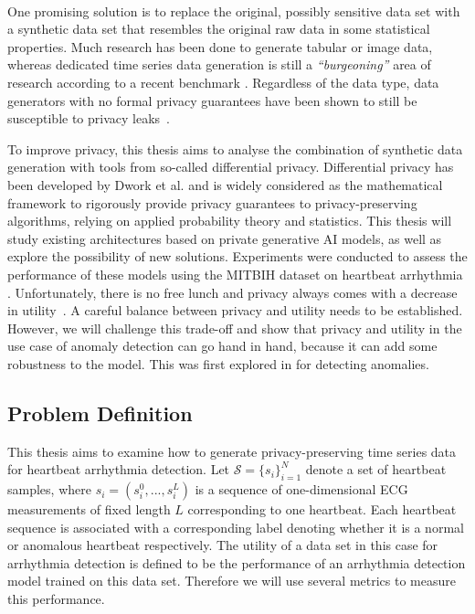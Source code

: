 \paragraph{}
One promising solution \parencite[see][]{jordon2022synthetic} is to replace the original, possibly sensitive data set with a synthetic data set that resembles the original raw data in some statistical properties. Much research has been done to generate tabular or image data, whereas dedicated time series data generation is still a \textit{``burgeoning''} area of research according to a recent benchmark \parencite[][]{ang2023tsgbench}. Regardless of the data type, data generators with no formal privacy guarantees have been shown to still be susceptible to privacy leaks~\cite{stadler2022synthetic}. 

To improve privacy, this thesis aims to analyse the combination of synthetic data generation with tools from so-called differential privacy. Differential privacy has been developed by Dwork et al. \parencite{dwork2006differential} and is widely considered as the mathematical framework to rigorously provide privacy guarantees to privacy-preserving algorithms, relying on applied probability theory and statistics. This thesis will study existing architectures based on private generative AI models, as well as explore the possibility of new solutions. Experiments were conducted to assess the performance of these models using the MITBIH dataset on heartbeat arrhythmia \parencite[][]{moody2001impact}. Unfortunately, there is no free lunch and privacy always comes with a decrease in utility~\cite{stadler2022synthetic}. A careful balance between privacy and utility needs to be established. However, we will challenge this trade-off and show that privacy and utility in the use case of anomaly detection can go hand in hand, because it can add some robustness to the model. This was first explored in \Parencite{du2019robust} for detecting anomalies.


\subsection{Problem Definition}

This thesis aims to examine how to generate privacy-preserving time series data for heartbeat arrhythmia detection. Let $\mathcal{S}={\{s_i\}}_{i=1}^N$ denote a set of heartbeat samples, where $s_i=(s_i^0,..., s_i^L)$ is a sequence of one-dimensional ECG measurements of fixed length $L$ corresponding to one heartbeat. Each heartbeat sequence is associated with a corresponding label denoting whether it is a normal or anomalous heartbeat respectively. The utility of a data set in this case for arrhythmia detection is defined to be the performance of an arrhythmia detection model trained on this data set. Therefore we will use several metrics to measure this performance.

